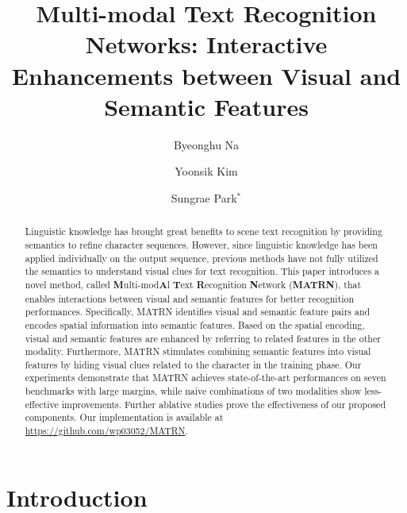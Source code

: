 \documentclass[runningheads]{llncs}
\begin{document}
\pagestyle{headings}
\mainmatter

\title{Multi-modal Text Recognition Networks: Interactive Enhancements between Visual and Semantic Features} 

\author{Byeonghu Na\and
Yoonsik Kim\and
Sungrae Park$^*$}
\maketitle

\begin{abstract}

Linguistic knowledge has brought great benefits to scene text recognition by providing semantics to refine character sequences. However, since linguistic knowledge has been applied individually on the output sequence, previous methods have not fully utilized the semantics to understand visual clues for text recognition. This paper introduces a novel method, called \textbf{M}ulti-mod\textbf{A}l \textbf{T}ext \textbf{R}ecognition \textbf{N}etwork (\textbf{MATRN}), that enables interactions between visual and semantic features for better recognition performances. Specifically, MATRN identifies visual and semantic feature pairs and encodes spatial information into semantic features. Based on the spatial encoding, visual and semantic features are enhanced by referring to related features in the other modality. Furthermore, MATRN stimulates combining semantic features into visual features by hiding visual clues related to the character in the training phase. Our experiments demonstrate that MATRN achieves state-of-the-art performances on seven benchmarks with large margins, while naive combinations of two modalities show less-effective improvements. Further ablative studies prove the effectiveness of our proposed components. Our implementation is available at \url{https://github.com/wp03052/MATRN}.
\end{abstract}


\section{Introduction}
\end{document}
